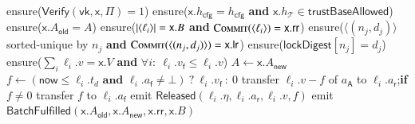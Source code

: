 \begin{algorithm}[!htbp]
\caption{Settlement $\textsc{FulfilBatch}$}\label{alg:bridge-settle}
\begin{algorithmic}[0]
  \State ensure($\mathsf{Verify}(\mathsf{vk},\mathsf{x},\Pi) = 1$)
  \State ensure($\mathsf{x}.h_\mathsf{cfg} = h_\mathsf{cfg}$ \textbf{and} $\mathsf{x}.h_\mathcal{T} \in \mathsf{trustBaseAllowed}$)
  \State ensure($\mathsf{x}.A_\mathsf{old} = A$) 
  \State ensure($\left|\langle\ell_i\rangle\right| = \mathsf{x}.B$ \textbf{and} $\Call{Commit}{\langle\ell_i\rangle} = \mathsf{x}.\mathsf{rr}$)
  \State ensure($\langle(n_j,d_j)\rangle$ sorted-unique by $n_j$ \textbf{and} $\Call{Commit}{\langle(n_j,d_j)\rangle} = \mathsf{x}.\mathsf{lr}$)
    \State ensure($\mathsf{lockDigest}[n_j] = d_j$)
  \EndFor
  \State ensure($\sum_i \ell_i.v = \mathsf{x}.V$ \textbf{and} $\forall i:\ \ell_i.v_\mathsf{f} \le \ell_i.v$)
  \State $A \gets \mathsf{x}.A_\mathsf{new}$ 
    \State $f \gets (\mathsf{now} \le \ell_i.t_d \textbf{ and } \ell_i.a_\mathsf{f} \ne \bot)\ ?\ \ell_i.v_\mathsf{f}\ :\ 0$ 
    \State transfer $\ell_i.v - f$ of $a_\mathsf{A}$ to $\ell_i.a_\mathsf{r}$;\quad \textbf{if} $f \ne 0$ transfer $f$ to $\ell_i.a_\mathsf{f}$
    \State emit $\mathsf{Released}(\ell_i.\eta, \ell_i.a_\mathsf{r}, \ell_i.v, f)$
  \EndFor
  \State emit $\mathsf{BatchFulfilled}(\mathsf{x}.A_\mathsf{old}, \mathsf{x}.A_\mathsf{new}, \mathsf{x}.\mathsf{rr}, \mathsf{x}.B)$
\EndFunction
\end{algorithmic}
\end{algorithm}

